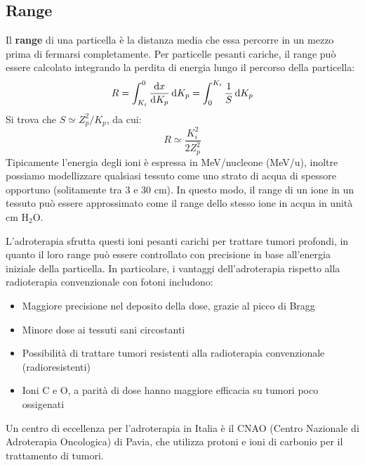 \subsection{Range}
Il \textbf{range} di una particella è la distanza media che essa percorre in un mezzo prima di fermarsi completamente. Per particelle pesanti cariche, il range può essere calcolato integrando la perdita di energia lungo il percorso della particella:
\begin{equation}
    R = \int_{K_i}^{0} \dv{x}{K_p}\dd{K_p} = \int_{0}^{K_i} \dfrac{1}{S}\dd{K_p}
\end{equation}
Si trova che $S \simeq Z_p^2/K_p$, da cui:
\begin{equation}
    R \simeq \dfrac{K_i^2}{2 Z_p^2}
\end{equation}
Tipicamente l'energia degli ioni è espressa in MeV/nucleone (MeV/u), inoltre possiamo modellizzare qualsiasi tessuto come uno strato di acqua di spessore opportuno (solitamente tra 3 e 30 cm). In questo modo, il range di un ione in un tessuto può essere approssimato come il range dello stesso ione in acqua in unità cm H$_2$O.


L'adroterapia sfrutta questi ioni pesanti carichi per trattare tumori profondi, in quanto il loro range può essere controllato con precisione in base all'energia iniziale della particella. In particolare, i vantaggi dell'adroterapia rispetto alla radioterapia convenzionale con fotoni includono:
\begin{itemize}
    \item Maggiore precisione nel deposito della dose, grazie al picco di Bragg
    \item Minore dose ai tessuti sani circostanti
    \item Possibilità di trattare tumori resistenti alla radioterapia convenzionale (radioresistenti)
    \item Ioni C e O, a parità di dose hanno maggiore efficacia su tumori poco ossigenati
\end{itemize}
Un centro di eccellenza per l'adroterapia in Italia è il CNAO (Centro Nazionale di Adroterapia Oncologica) di Pavia, che utilizza protoni e ioni di carbonio per il trattamento di tumori.

